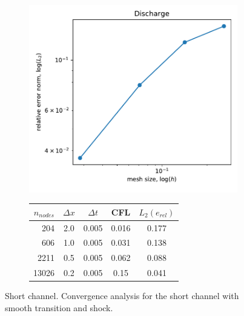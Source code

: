 \documentclass[a4paper,12pt]{article}
\begin{document}
\begin{figure}
\begin{subfigure}{0.4\textwidth}
    \includegraphics[width=\textwidth]{img/jump/momentum_convergence.pdf}    
\end{subfigure}
\hfill
\begin{subfigure}{0.58\textwidth}
    \begin{tabular}{>{\small}rcccc} \hline
    $n_{nodes}$ & $\Delta x$ & $\Delta t$ & CFL   & $L_2(e_{rel})$ \\ \hline
    204         &        2.0 &      0.005 & 0.016 & 0.177 \\
    606         &        1.0 &      0.005 & 0.031 & 0.138 \\
    2211        &        0.5 &      0.005 & 0.062 & 0.088 \\
    13026       &        0.2 &      0.005 & 0.15  & 0.041 \\ \hline
    \end{tabular}
\end{subfigure}
\caption{Short channel. Convergence analysis for the short channel with smooth transition and shock.}
\label{hydraulic_jump_convergence}
\end{figure}
\end{document}
